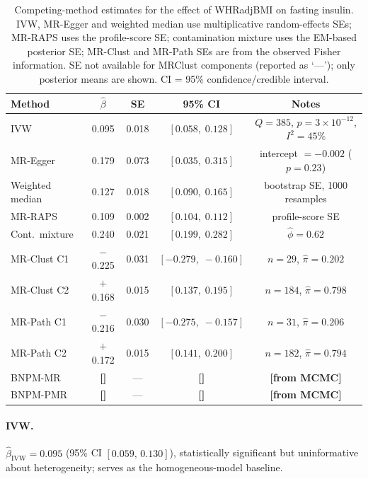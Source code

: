\documentclass[12pt,a4paper]{article}
\newcommand{\placeholder}[1]{\textcolor{fcblue}{\textbf{[#1]}}}
\begin{document}
\begin{table}[h!]
\centering
\caption{Competing-method estimates for the effect of WHRadjBMI on fasting
insulin.  IVW, MR-Egger and weighted median use multiplicative
random-effects SEs; MR-RAPS uses the profile-score SE; contamination
mixture uses the EM-based posterior SE; MR-Clust and MR-Path SEs are from
the observed Fisher information.  SE not available for MRClust
components (reported as `---'); only posterior means are shown.
CI = 95\% confidence/credible interval.}
\label{tab:methods}
\small
\setlength{\tabcolsep}{5pt}
\begin{tabular}{lcccc}
\toprule
Method & $\hat\beta$ & SE & 95\% CI & Notes \\
\midrule
IVW & 0.095 & 0.018 & $[0.058,\; 0.128]$
  & $Q=385$, $p=3\times10^{-12}$, $I^2=45\%$ \\
MR-Egger & 0.179 & 0.073 & $[0.035,\; 0.315]$
  & intercept $=-0.002$ ($p=0.23$) \\
Weighted median & 0.127 & 0.018 & $[0.090,\; 0.165]$
  & bootstrap SE, 1000 resamples \\
MR-RAPS & 0.109 & 0.002 & $[0.104,\; 0.112]$
  & profile-score SE \\
Cont.\ mixture & 0.240 & 0.021 & $[0.199,\; 0.282]$
  & $\hat\phi=0.62$ \\[4pt]
MR-Clust C1 & $-$0.225 & 0.031 & $[-0.279,\; -0.160]$
  & $n=29$, $\hat\pi=0.202$ \\
MR-Clust C2 & $+$0.168 & 0.015 & $[0.137,\; 0.195]$
  & $n=184$, $\hat\pi=0.798$ \\[4pt]
MR-Path C1 & $-$0.216 & 0.030 & $[-0.275,\; -0.157]$
  & $n=31$, $\hat\pi=0.206$ \\
MR-Path C2 & $+$0.172 & 0.015 & $[0.141,\; 0.200]$
  & $n=182$, $\hat\pi=0.794$ \\[4pt]
BNPM-MR & \placeholder{} & --- & \placeholder{}
  & \placeholder{from MCMC} \\
BNPM-PMR & \placeholder{} & --- & \placeholder{}
  & \placeholder{from MCMC} \\
\bottomrule
\end{tabular}
\end{table}

\paragraph{IVW.}
$\hat\beta_{\mathrm{IVW}} = 0.095$ (95\% CI $[0.059,\, 0.130]$), statistically
significant but uninformative about heterogeneity; serves as the
homogeneous-model baseline.
\end{document}

